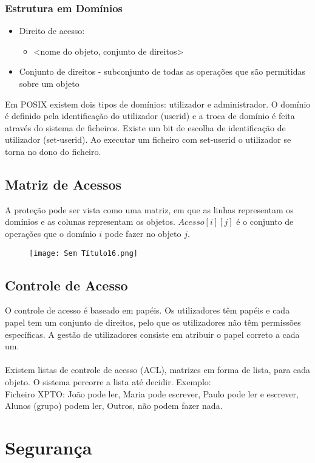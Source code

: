 \documentclass[10pt,a4paper]{report}
\begin{document}
\subsubsection{Estrutura em Domínios}
\begin{itemize}
\item Direito de acesso:
\begin{itemize}
\item <nome do objeto, {conjunto de direitos}>
\end{itemize}
\item Conjunto de direitos - subconjunto de todas as operações que são permitidas sobre um objeto
\end{itemize}
Em POSIX existem dois tipos de domínios: utilizador e administrador. O domínio é definido pela identificação do utilizador (userid) e a troca de domínio é feita através do sistema de ficheiros. Existe um bit de escolha de identificação de utilizador (set-userid). Ao executar um ficheiro com set-userid o utilizador se torna no dono do ficheiro.
\subsection{Matriz de Acessos}
A proteção pode ser vista como uma matriz, em que as linhas representam os domínios e as colunas representam os objetos. $Acesso[i][j]$ é o conjunto de operações que o domínio $i$ pode fazer no objeto $j$.
\begin{figure}[H]
\centering
\texttt{[image: Sem Título16.png]}
\end{figure}
\subsection{Controle de Acesso}
O controle de acesso é baseado em papéis. Os utilizadores têm papéis e cada papel tem um conjunto de direitos, pelo que os utilizadores não têm permissões específicas. A gestão de utilizadores consiste em atribuir o papel correto a cada um.\\
\\
Existem listas de controle de acesso (ACL), matrizes em forma de lista, para cada objeto. O sistema percorre a lista até decidir. Exemplo:\\
Ficheiro XPTO: João pode ler, Maria pode escrever, Paulo pode ler e escrever, Alunos (grupo) podem ler, Outros, não podem fazer nada.
\section{Segurança}
\end{document}
